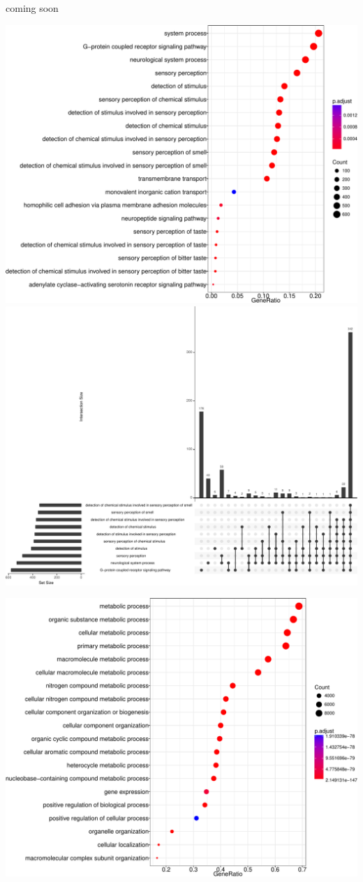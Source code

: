 \documentclass[]{article}
\begin{document}
coming soon

\includegraphics{final_report_files/figure-latex/human_not_in_IMEx_protein_properties_GOenrichment-1.pdf}
\includegraphics{final_report_files/figure-latex/human_not_in_IMEx_protein_properties_GOenrichment-2.pdf}

\includegraphics{final_report_files/figure-latex/human_not_in_IMEx_protein_properties_GOdepleted-1.pdf}
\end{document}
